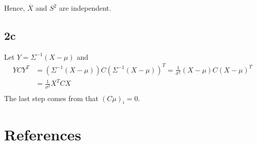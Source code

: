 \documentclass{article}
\theoremstyle{remark}
\begin{document}
Hence, $\overline{X} $ and $S^{2}$ are independent.

\newpage
\subsection*{2c}%
\label{sec:2c}


Let $\displaystyle Y = \Sigma ^{-1} \left( X- \mu  \right)$ and \[
    \begin{split}
Y C Y^{T} & = \left( \Sigma ^{-1} \left( X- \mu  \right) \right) C \left( \Sigma ^{-1} \left( X- \mu  \right) \right) ^{T}
= \frac{1}{\sigma ^2}   \left( X- \mu  \right)  C   \left( X- \mu  \right)  ^{T} \\
&= \frac{1}{\sigma^2 } X^{T} C X \\
    \end{split}
\]
The last step comes from that $\left( C \mu  \right)_i  = 0$.




\newpage
\section{References}%
\label{sec:references}



\end{document}
